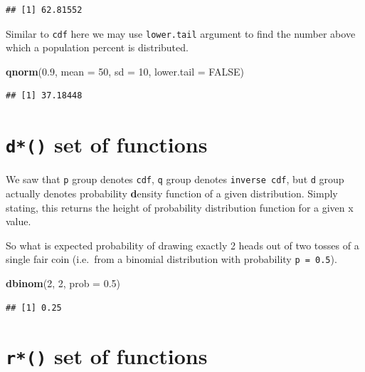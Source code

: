 \documentclass[
]{book}
\newenvironment{Shaded}{\begin{snugshade}}{\end{snugshade}}
\newcommand{\AttributeTok}[1]{\textcolor[rgb]{0.13,0.29,0.53}{#1}}
\newcommand{\ConstantTok}[1]{\textcolor[rgb]{0.56,0.35,0.01}{#1}}
\newcommand{\DecValTok}[1]{\textcolor[rgb]{0.00,0.00,0.81}{#1}}
\newcommand{\FloatTok}[1]{\textcolor[rgb]{0.00,0.00,0.81}{#1}}
\newcommand{\FunctionTok}[1]{\textcolor[rgb]{0.13,0.29,0.53}{\textbf{#1}}}
\newcommand{\NormalTok}[1]{#1}
\begin{document}
\begin{verbatim}
## [1] 62.81552
\end{verbatim}

Similar to \texttt{cdf} here we may use \texttt{lower.tail} argument to find the number above which a population percent is distributed.

\begin{Shaded}
\begin{Highlighting}[]
\FunctionTok{qnorm}\NormalTok{(}\FloatTok{0.9}\NormalTok{, }\AttributeTok{mean =} \DecValTok{50}\NormalTok{, }\AttributeTok{sd =} \DecValTok{10}\NormalTok{, }\AttributeTok{lower.tail =} \ConstantTok{FALSE}\NormalTok{)}
\end{Highlighting}
\end{Shaded}

\begin{verbatim}
## [1] 37.18448
\end{verbatim}

\hypertarget{d-set-of-functions}{%
\section{\texorpdfstring{\texttt{d*()} set of functions}{d*() set of functions}}\label{d-set-of-functions}}

We saw that \texttt{p} group denotes \texttt{cdf}, \texttt{q} group denotes \texttt{inverse\ cdf}, but \texttt{d} group actually denotes probability \textbf{d}ensity function of a given distribution. Simply stating, this returns the height of probability distribution function for a given x value.

So what is expected probability of drawing exactly 2 heads out of two tosses of a single fair coin (i.e.~from a binomial distribution with probability \texttt{p\ =\ 0.5}).

\begin{Shaded}
\begin{Highlighting}[]
\FunctionTok{dbinom}\NormalTok{(}\DecValTok{2}\NormalTok{, }\DecValTok{2}\NormalTok{, }\AttributeTok{prob =} \FloatTok{0.5}\NormalTok{)}
\end{Highlighting}
\end{Shaded}

\begin{verbatim}
## [1] 0.25
\end{verbatim}

\hypertarget{r-set-of-functions}{%
\section{\texorpdfstring{\texttt{r*()} set of functions}{r*() set of functions}}\label{r-set-of-functions}}
\end{document}
